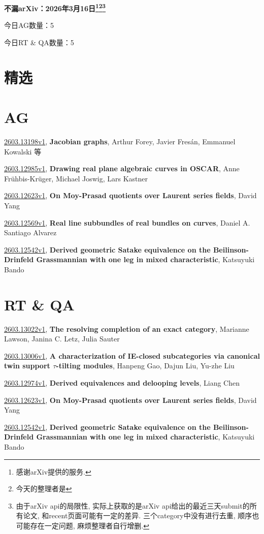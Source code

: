 \documentclass[9pt, a4paper]{article}
\theoremstyle{plain}
\theoremstyle{definition}
\theoremstyle{remark}
\newcommand{\arxiv}[3]{\href{https://arxiv.org/abs/#1}{#1}, \textbf{\textcolor{arxivblue}{#2}}, #3}
\newcommand{\AGnumber}{5}
\newcommand{\RTQAnumber}{5}
\newcommand{\NewestDate}{2026年3月16日}
\newcommand{\todayarXiver}{} %
\begin{document}
\begin{center}
    \Huge\textbf{不漏arXiv：\NewestDate\footnote{感谢arXiv提供的服务.}\footnote{今天的整理者是\todayarXiver}\footnote{由于arXiv api的局限性, 实际上获取的是arXiv api给出的最近三天submit的所有论文, 和recent页面可能有一定的差异. 三个category中没有进行去重, 顺序也可能存在一定问题, 麻烦整理者自行增删.}} \\
\end{center}

\setcounter{section}{-1}

\begin{center}
    今日AG数量：\AGnumber
    
    今日RT \& QA数量：\RTQAnumber
    
\end{center}


\section{精选}


\section{AG}
\arxiv{2603.13198v1}{Jacobian graphs}{Arthur Forey, Javier Fresán, Emmanuel Kowalski 等}

\arxiv{2603.12985v1}{Drawing real plane algebraic curves in OSCAR}{Anne Frühbis-Krüger, Michael Joswig, Lars Kastner}

\arxiv{2603.12623v1}{On Moy-Prasad quotients over Laurent series fields}{David Yang}

\arxiv{2603.12569v1}{Real line subbundles of real bundles on curves}{Daniel A. Santiago Alvarez}

\arxiv{2603.12542v1}{Derived geometric Satake equivalence on the Beilinson-Drinfeld Grassmannian with one leg in mixed characteristic}{Katsuyuki Bando}


\section{RT \& QA}
\arxiv{2603.13022v1}{The resolving completion of an exact category}{Marianne Lawson, Janina C. Letz, Julia Sauter}

\arxiv{2603.13006v1}{A characterization of IE-closed subcategories via canonical twin support $τ$-tilting modules}{Hanpeng Gao, Dajun Liu, Yu-zhe Liu}

\arxiv{2603.12974v1}{Derived equivalences and delooping levels}{Liang Chen}

\arxiv{2603.12623v1}{On Moy-Prasad quotients over Laurent series fields}{David Yang}

\arxiv{2603.12542v1}{Derived geometric Satake equivalence on the Beilinson-Drinfeld Grassmannian with one leg in mixed characteristic}{Katsuyuki Bando}

\end{document}
